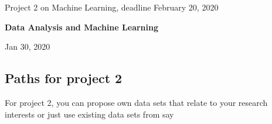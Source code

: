 \documentclass[%
oneside,                 %
final,                   %
10pt]{article}
\begin{document}

\newcommand{\exercisesection}[1]{\subsection*{#1}}






\thispagestyle{empty}

\begin{center}
{\LARGE\bf
\begin{spacing}{1.25}
Project 2 on Machine Learning, deadline February 20, 2020
\end{spacing}
}
\end{center}


\begin{center}
{\bf Data Analysis and Machine Learning${}^{}$} \\ [0mm]
\end{center}

\begin{center}
\end{center}
    

\begin{center}
Jan 30, 2020
\end{center}

\vspace{1cm}


\subsection*{Paths for project 2}

For project 2, you can propose own data sets that relate to your
research interests or just use existing data sets from say
\end{document}
